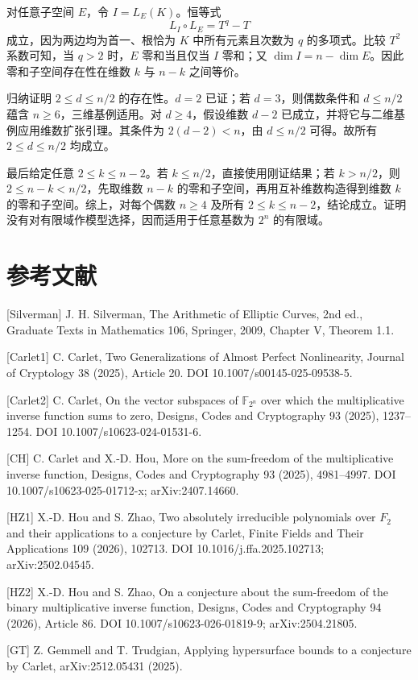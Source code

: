 \documentclass[11pt]{ctexart}
\begin{document}
对任意子空间 $E$，令 $I=L_E(K)$。恒等式
\[
L_I\circ L_E=T^q-T
\]
成立，因为两边均为首一、根恰为 $K$ 中所有元素且次数为 $q$ 的多项式。比较 $T^2$ 系数可知，当 $q>2$ 时，$E$ 零和当且仅当 $I$ 零和；又 $\dim I=n-\dim E$。因此零和子空间存在性在维数 $k$ 与 $n-k$ 之间等价。

归纳证明 $2\le d\le n/2$ 的存在性。$d=2$ 已证；若 $d=3$，则偶数条件和 $d\le n/2$ 蕴含 $n\ge6$，三维基例适用。对 $d\ge4$，假设维数 $d-2$ 已成立，并将它与二维基例应用维数扩张引理。其条件为 $2(d-2)<n$，由 $d\le n/2$ 可得。故所有 $2\le d\le n/2$ 均成立。

最后给定任意 $2\le k\le n-2$。若 $k\le n/2$，直接使用刚证结果；若 $k>n/2$，则 $2\le n-k<n/2$，先取维数 $n-k$ 的零和子空间，再用互补维数构造得到维数 $k$ 的零和子空间。综上，对每个偶数 $n\ge4$ 及所有 $2\le k\le n-2$，结论成立。证明没有对有限域作模型选择，因而适用于任意基数为 $2^n$ 的有限域。

\section{参考文献}

[Silverman] J. H. Silverman, The Arithmetic of Elliptic Curves, 2nd ed., Graduate Texts in Mathematics 106, Springer, 2009, Chapter V, Theorem 1.1.

[Carlet1] C. Carlet, Two Generalizations of Almost Perfect Nonlinearity, Journal of Cryptology 38 (2025), Article 20. DOI 10.1007/s00145-025-09538-5.

[Carlet2] C. Carlet, On the vector subspaces of \ensuremath{\mathbb F_{2^n}} over which the multiplicative inverse function sums to zero, Designs, Codes and Cryptography 93 (2025), 1237–1254. DOI 10.1007/s10623-024-01531-6.

[CH] C. Carlet and X.-D. Hou, More on the sum-freedom of the multiplicative inverse function, Designs, Codes and Cryptography 93 (2025), 4981–4997. DOI 10.1007/s10623-025-01712-x; arXiv:2407.14660.

[HZ1] X.-D. Hou and S. Zhao, Two absolutely irreducible polynomials over \ensuremath{F_2} and their applications to a conjecture by Carlet, Finite Fields and Their Applications 109 (2026), 102713. DOI 10.1016/j.ffa.2025.102713; arXiv:2502.04545.

[HZ2] X.-D. Hou and S. Zhao, On a conjecture about the sum-freedom of the binary multiplicative inverse function, Designs, Codes and Cryptography 94 (2026), Article 86. DOI 10.1007/s10623-026-01819-9; arXiv:2504.21805.

[GT] Z. Gemmell and T. Trudgian, Applying hypersurface bounds to a conjecture by Carlet, arXiv:2512.05431 (2025).
\end{document}

